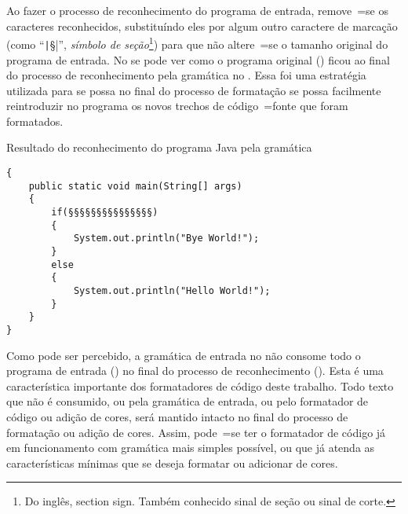 Ao fazer o processo de reconhecimento do programa de entrada,
remove~=se os caracteres reconhecidos,
substituíndo eles por algum outro caractere de marcação (como ``\texttt|§|'',
\textit{símbolo de seção}\footnote{%
Do inglês,
section sign.
Também conhecido sinal de seção ou
sinal de corte.
}) para que não altere~=se o tamanho original do programa de entrada.
No  se pode ver como o programa original () ficou ao final do processo de reconhecimento pela gramática no .
Essa foi uma estratégia utilizada para se possa no final do processo de formatação se possa facilmente reintroduzir no programa os novos trechos de código~=fonte que foram formatados.
\begin{code}
\caption{Resultado do reconhecimento do programa Java pela gramática}
\label{code:resultadoDoReconhecimentoDoProgramaJava}
\begin{verbatim}
{
    public static void main(String[] args)
    {
        if(§§§§§§§§§§§§§§§)
        {
            System.out.println("Bye World!");
        }
        else
        {
            System.out.println("Hello World!");
        }
    }
}
\end{verbatim}
\end{code}

Como pode ser percebido,
a gramática de entrada no  não consome todo o programa de entrada () no final do processo de reconhecimento ().
Esta é uma característica importante dos formatadores de código deste trabalho.
Todo texto que não é consumido,
ou pela gramática de entrada,
ou pelo formatador de código ou
adição de cores,
será mantido intacto no final do processo de formatação ou
adição de cores.
Assim,
pode~=se ter o formatador de código já em funcionamento com gramática mais simples possível,
ou que já atenda as características mínimas que se deseja formatar ou
adicionar de cores.

